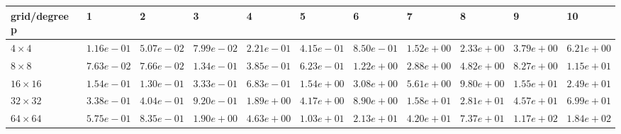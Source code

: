 \begin{tabular}{lllllllllll}
\hline
 grid/degree p   & 1          & 2          & 3          & 4          & 5          & 6          & 7          & 8          & 9          & 10         \\
\hline
 $4 \times 4$    & $1.16e-01$ & $5.07e-02$ & $7.99e-02$ & $2.21e-01$ & $4.15e-01$ & $8.50e-01$ & $1.52e+00$ & $2.33e+00$ & $3.79e+00$ & $6.21e+00$ \\
 $8 \times 8$    & $7.63e-02$ & $7.66e-02$ & $1.34e-01$ & $3.85e-01$ & $6.23e-01$ & $1.22e+00$ & $2.88e+00$ & $4.82e+00$ & $8.27e+00$ & $1.15e+01$ \\
 $16 \times 16$  & $1.54e-01$ & $1.30e-01$ & $3.33e-01$ & $6.83e-01$ & $1.54e+00$ & $3.08e+00$ & $5.61e+00$ & $9.80e+00$ & $1.55e+01$ & $2.49e+01$ \\
 $32 \times 32$  & $3.38e-01$ & $4.04e-01$ & $9.20e-01$ & $1.89e+00$ & $4.17e+00$ & $8.90e+00$ & $1.58e+01$ & $2.81e+01$ & $4.57e+01$ & $6.99e+01$ \\
 $64 \times 64$  & $5.75e-01$ & $8.35e-01$ & $1.90e+00$ & $4.63e+00$ & $1.03e+01$ & $2.13e+01$ & $4.20e+01$ & $7.37e+01$ & $1.17e+02$ & $1.84e+02$ \\
\hline
\end{tabular}